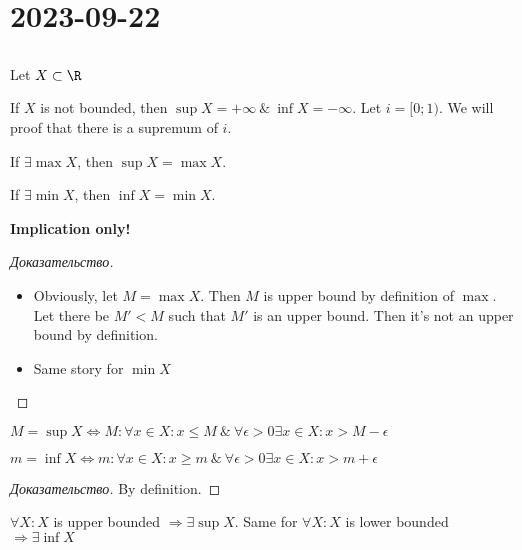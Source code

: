 \section{2023-09-22}

\subsection{}

Let $X \subset \R$

\begin{note}[]
	If $X$ is not bounded, then $\sup X = +\infty \ \& \ \inf X = -\infty$. Let $i = [0; 1)$. We will proof that there is a supremum of $i$.
\end{note}

\begin{lemma}
	If $\exists \max X$, then $\sup X = \max X$.

	If $\exists \min X$, then $\inf X = \min X$.
	
	\textbf{Implication only!}
\end{lemma}

\begin{proof}[Доказательство]
	\begin{itemize}
		\item Obviously, let $M = \max X$. Then $M$ is upper bound by definition of $\max$. Let there be $M' < M$ such that $M'$ is an upper bound. Then it's not an upper bound by definition.
		\item Same story for $\min X$ 
	\end{itemize}
\end{proof}

\begin{lemma}
	$M = \sup X \Leftrightarrow M: \forall x \in X: x \leq M \ \& \ \forall \epsilon > 0 \exists x \in X: x > M - \epsilon$

	$m = \inf X \Leftrightarrow m: \forall x \in X: x \geq m \ \& \ \forall \epsilon > 0 \exists x \in X: x > m + \epsilon$
\end{lemma}

\begin{proof}[Доказательство]
	By definition.
\end{proof}

\begin{theorem}
	$\forall X: X$ is upper bounded $ \Rightarrow \exists \sup X$. Same for $\forall X: X$ is lower bounded $ \Rightarrow \exists \inf X$
\end{theorem}

